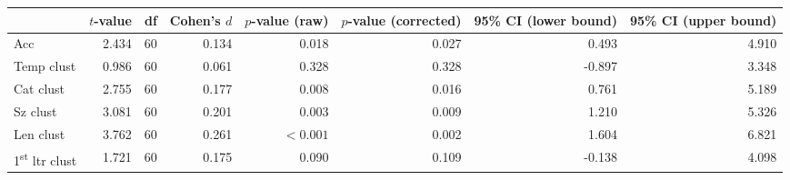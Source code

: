 \begin{tabular}{lrrrrrrr}
\toprule
 & $t$-value & df & Cohen's $d$ & $p$-value (raw) & $p$-value (corrected) & 95\% CI (lower bound) & 95\% CI (upper bound) \\
\midrule
\rowcolor[HTML]{fffee3} Acc & 2.434 & 60 & 0.134 & 0.018 & 0.027 & 0.493 & 4.910 \\
 Temp clust & 0.986 & 60 & 0.061 & 0.328 & 0.328 & -0.897 & 3.348 \\
\rowcolor[HTML]{fffee3} Cat clust & 2.755 & 60 & 0.177 & 0.008 & 0.016 & 0.761 & 5.189 \\
\rowcolor[HTML]{fffee3} Sz clust & 3.081 & 60 & 0.201 & 0.003 & 0.009 & 1.210 & 5.326 \\
\rowcolor[HTML]{fffee3} Len clust & 3.762 & 60 & 0.261 & $< 0.001$ & 0.002 & 1.604 & 6.821 \\
 1\textsuperscript{st} ltr clust & 1.721 & 60 & 0.175 & 0.090 & 0.109 & -0.138 & 4.098 \\
\bottomrule
\end{tabular}